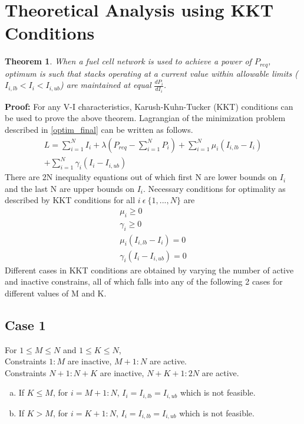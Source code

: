 \documentclass[twocolumn]{autart}
\newtheorem{theorem}{Theorem}
\begin{document}
\section{Theoretical Analysis using KKT Conditions}
\label{genrlsoln}

\begin{theorem}
\label{theorem1}
When a fuel cell network is used to achieve a power of $P_{req}$, optimum is such that stacks operating at a current value within allowable limits ($I_{i,lb} < I_i < I_{i,ub}$) are maintained at equal $\frac{dP_{i}}{dI_i}$. 
\end{theorem}

\textbf{Proof:} 
For any V-I characteristics, Karush-Kuhn-Tucker (KKT) conditions \cite{kuhn1951proceedings} can be used to prove the above theorem. Lagrangian of the minimization problem described in \eqref{optim_final} can be written as follows.
\begin{multline}
L = \sum_{i=1}^N I_i +\lambda \left(P_{req} -\sum_{i=1}^N P_i\right) + \sum_{i=1}^{N} \mu_i (I_{i,lb} - I_i)\\ + \sum_{i=1}^{N}\gamma_i (I_i - I_{i,ub})
\end{multline}
There are 2N inequality equations out of which first N are lower bounds on $I_i$ and the last N are upper bounds on $I_i$. Necessary conditions for optimality as described by KKT conditions for all $i \ \epsilon \ \{1,...,N\}$ are
\begin{gather}
\mu_i \geq 0 \\
\gamma_i \geq 0\\
\label{kktcondn1}
\mu_i (I_{i,lb}-I_i) = 0  \\ \label{kktcondn2}
\gamma_i (I_i - I_{i,ub}) = 0
\end{gather}
Different cases in KKT conditions are obtained by varying the number of active and inactive constrains, all of which falls into any of the following 2 cases for different values of M and K. 
\subsection*{Case 1}
For $1 \leq M \leq N$ and $1 \leq K \leq N$, \\
Constraints $1:M$ are inactive, $M+1:N$ are active.\\
Constraints $N+1:N+K$ are inactive, $N+K+1:2N$ are active.
\begin{enumerate}[(a)]
\item If $K \leq M$, for $i = M+1:N$, $I_i = I_{i,lb} = I_{i,ub}$ which is not feasible.
\item If $K > M$, for $i = K+1:N$, $I_i = I_{i,lb} = I_{i,ub}$ which is not feasible.
\end{enumerate}
\end{document}
